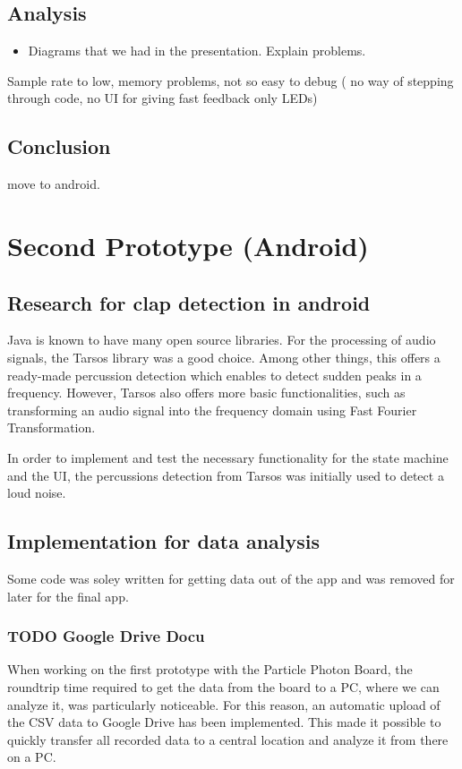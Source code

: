 \documentclass
[
 12pt, %
       DIV12,
       a4paper,
       oneside,
       titlepage,
       parskip=half,
       headings=normal,
       listof=totoc,
       bibliography=totoc,
       index=totoc,
       captions=tableheading,
       ]{scrreprt}
\begin{document}
\section{Analysis}
\label{sec:org0663f3c}
\begin{itemize}
\item Diagrams that we had in the presentation. Explain problems.
\end{itemize}

Sample rate to low, memory problems, not so easy to debug ( no way of stepping
through code, no UI for giving fast feedback only LEDs)
\section{Conclusion}
\label{sec:orgcb80fd3}
move to android.



\chapter{Second Prototype (Android)}
\label{sec:org319f9aa}

\section{Research for clap detection in android}
\label{sec:org6b348b8}
Java is known to have many open source libraries. For the processing of audio
signals, the Tarsos library was a good choice. Among other things, this offers a
ready-made percussion detection which enables to detect sudden peaks in a
frequency. However, Tarsos also offers more basic functionalities, such as
transforming an audio signal into the frequency domain using Fast Fourier
Transformation.

In order to implement and test the necessary functionality for the state machine
and the UI, the percussions detection from Tarsos was initially used to detect a
loud noise.

\section{Implementation for data analysis}
\label{sec:orgcdc663b}
Some code was soley written for getting data out of the app and was removed for
later for the final app.

\subsection{{\bfseries\sffamily TODO} Google Drive Docu}
\label{sec:orgd6417a8}
When working on the first prototype with the Particle Photon Board, the
roundtrip time required to get the data from the board to a PC, where we can
analyze it, was particularly noticeable. For this reason, an automatic upload of
the CSV data to Google Drive has been implemented. This made it possible to
quickly transfer all recorded data to a central location and analyze it from
there on a PC.
\end{document}

